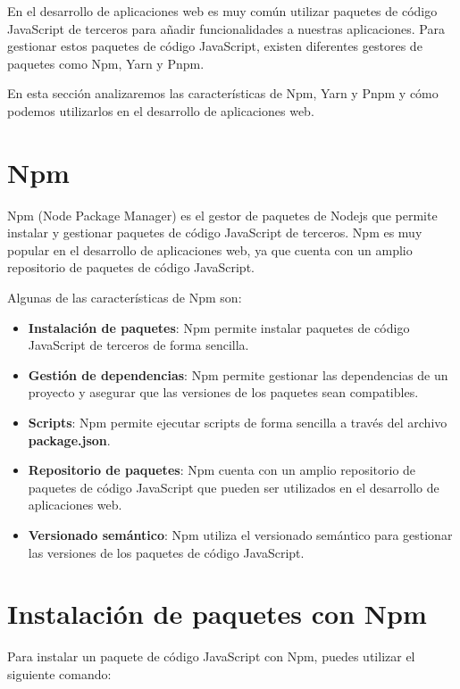 \documentclass[
  a4paper,
  DIV=11,
  numbers=noendperiod,
  onepage,
  openany]{scrreprt}
\begin{document}
\begin{tcolorbox}
En el desarrollo de aplicaciones web es muy común utilizar paquetes de
código JavaScript de terceros para añadir funcionalidades a nuestras
aplicaciones. Para gestionar estos paquetes de código JavaScript,
existen diferentes gestores de paquetes como Npm, Yarn y Pnpm.

En esta sección analizaremos las características de Npm, Yarn y Pnpm y
cómo podemos utilizarlos en el desarrollo de aplicaciones web.

\section{Npm}\label{npm}

Npm (Node Package Manager) es el gestor de paquetes de Nodejs que
permite instalar y gestionar paquetes de código JavaScript de terceros.
Npm es muy popular en el desarrollo de aplicaciones web, ya que cuenta
con un amplio repositorio de paquetes de código JavaScript.

Algunas de las características de Npm son:

\begin{itemize}
\item
  \textbf{Instalación de paquetes}: Npm permite instalar paquetes de
  código JavaScript de terceros de forma sencilla.
\item
  \textbf{Gestión de dependencias}: Npm permite gestionar las
  dependencias de un proyecto y asegurar que las versiones de los
  paquetes sean compatibles.
\item
  \textbf{Scripts}: Npm permite ejecutar scripts de forma sencilla a
  través del archivo \textbf{package.json}.
\item
  \textbf{Repositorio de paquetes}: Npm cuenta con un amplio repositorio
  de paquetes de código JavaScript que pueden ser utilizados en el
  desarrollo de aplicaciones web.
\item
  \textbf{Versionado semántico}: Npm utiliza el versionado semántico
  para gestionar las versiones de los paquetes de código JavaScript.
\end{itemize}

\section{Instalación de paquetes con
Npm}\label{instalaciuxf3n-de-paquetes-con-npm}

Para instalar un paquete de código JavaScript con Npm, puedes utilizar
el siguiente comando:


\end{tcolorbox}
\end{document}
